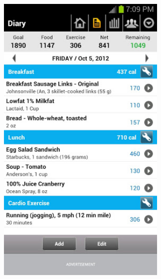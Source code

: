\begin{enumerate}
\begin{figure}[h!t]
{\begin{subfigure}[b]{.33\textwidth}
{  \includegraphics[width=0.9\textwidth]{ch2/RelatedApps/MyFitnessPal/1.jpg}
  }
\end{subfigure}%
\begin{subfigure}[b]{.33\textwidth}
  \centering
  \fbox{
}
\end{subfigure}}
\end{figure}
\end{enumerate}
